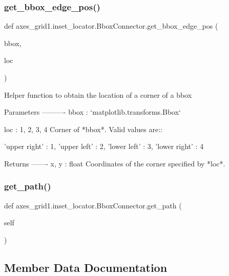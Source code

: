 \subsubsection{\texorpdfstring{get\+\_\+bbox\+\_\+edge\+\_\+pos()}{get\_bbox\_edge\_pos()}}
{\footnotesize\ttfamily def axes\+\_\+grid1.\+inset\+\_\+locator.\+Bbox\+Connector.\+get\+\_\+bbox\+\_\+edge\+\_\+pos (\begin{DoxyParamCaption}\item[{}]{bbox,  }\item[{}]{loc }\end{DoxyParamCaption})\hspace{0.3cm}{\ttfamily [static]}}

\begin{DoxyVerb}Helper function to obtain the location of a corner of a bbox

Parameters
----------
bbox : `matplotlib.transforms.Bbox`

loc : {1, 2, 3, 4}
    Corner of *bbox*. Valid values are::

'upper right'  : 1,
'upper left'   : 2,
'lower left'   : 3,
'lower right'  : 4

Returns
-------
x, y : float
    Coordinates of the corner specified by *loc*.
\end{DoxyVerb}
 \mbox{\label{classaxes__grid1_1_1inset__locator_1_1BboxConnector_a109f4a733678e9b9a8e7f582620e25dd}} 
\subsubsection{\texorpdfstring{get\+\_\+path()}{get\_path()}}
{\footnotesize\ttfamily def axes\+\_\+grid1.\+inset\+\_\+locator.\+Bbox\+Connector.\+get\+\_\+path (\begin{DoxyParamCaption}\item[{}]{self }\end{DoxyParamCaption})}



\subsection{Member Data Documentation}
\mbox{\label{classaxes__grid1_1_1inset__locator_1_1BboxConnector_a63b35233dec9f318cdc800f53aef552b}} 
